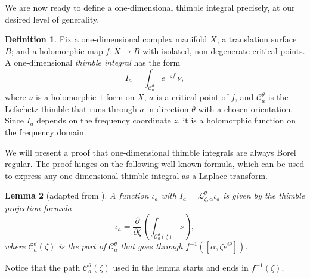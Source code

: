 \documentclass{article}
\newcommand{\maps}{\colon}
\newcommand{\laplace}{\mathcal{L}}
\theoremstyle{definition}
\newtheorem{definition}{Definition}[section]
\theoremstyle{plain}
\newtheorem{lemma}[definition]{Lemma}
\begin{document}

We are now ready to define a one-dimensional thimble integral precisely, at our desired level of generality.
\begin{definition}
Fix a one-dimensional complex manifold $X$; a translation surface $B$; and a holomorphic map $f \maps X \to B$ with isolated, non-degenerate critical points. A one-dimensional {\em thimble integral} has the form
\[ I_a = \int_{\mathcal{C}_a^\theta} e^{-zf}\,\nu, \]
where $\nu$ is a holomorphic $1$-form on $X$, $a$ is a critical point of $f$, and $\mathcal{C}^\theta_a$ is the Lefschetz thimble that runs through $a$ in direction $\theta$ with a chosen orientation. Since $I_a$ depends on the frequency coordinate $z$, it is a holomorphic function on the frequency domain.
\end{definition}
We will present a proof that one-dimensional thimble integrals are always Borel regular. The proof hinges on the following well-known formula, which can be used to express any one-dimensional thimble integral as a Laplace transform.
\begin{lemma}[adapted from {\cite[Section~3.3]{pham}}]\label{lem:thimble_proj_formula}
A function $\iota_a$ with $I_a = \laplace_{\zeta, \alpha}^\theta \iota_a$ is given by the {\em thimble projection formula}
\begin{equation}\label{eqn:formula}
    \iota_a = \frac{\partial}{\partial \zeta} \left( \int_{\mathcal{C}_a^\theta(\zeta)}\nu \right),
\end{equation}
where $\mathcal{C}_a^\theta(\zeta)$ is the part of $\mathcal{C}_a^\theta$ that goes through $f^{-1}([\alpha,\zeta e^{i\theta}])$.
\end{lemma}
Notice that the path $\mathcal{C}_a^\theta(\zeta)$ used in the lemma starts and ends in $f^{-1}(\zeta)$.
\end{document}
